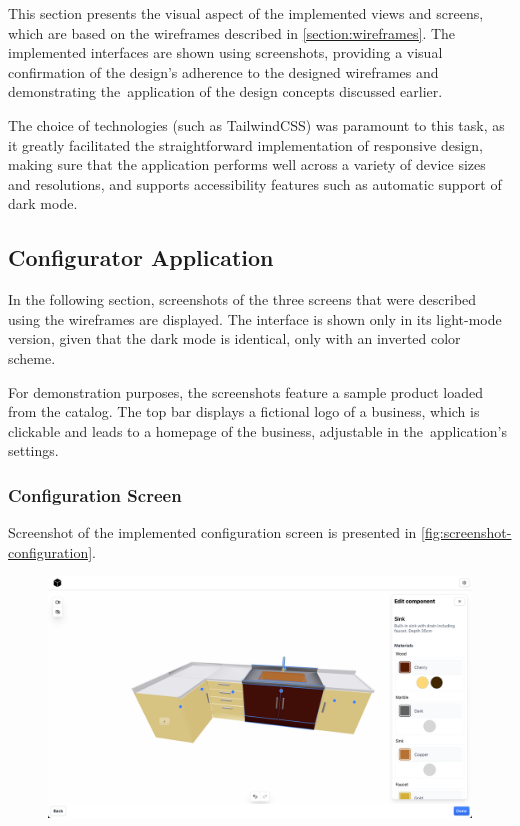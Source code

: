 This section presents the visual aspect of the implemented views and screens, which are based on the wireframes described in \autoref{section:wireframes}. The implemented interfaces are shown using screenshots, providing a visual confirmation of the design's adherence to the designed wireframes and demonstrating the~application of the design concepts discussed earlier.

The choice of technologies (such as TailwindCSS) was paramount to this task, as it greatly facilitated the straightforward implementation of responsive design, making sure that the application performs well across a variety of device sizes and resolutions, and supports accessibility features such as automatic support of dark mode.


\subsection{Configurator Application}

In the following section, screenshots of the three screens that were described using the wireframes are displayed. The interface is shown only in its light-mode version, given that the dark mode is identical, only with an inverted color scheme.

For demonstration purposes, the screenshots feature a sample product loaded from the catalog. The top bar displays a fictional logo of a business, which is clickable and leads to a homepage of the business, adjustable in the~application's settings.  


\subsubsection{Configuration Screen}

Screenshot of the implemented configuration screen is presented in \autoref{fig:screenshot-configuration}.

\begin{figure}[h]
\centering
\includegraphics[width=\textwidth]{images/screenshot_configuration.png}
\label{fig:screenshot-configuration}
\end{figure}

